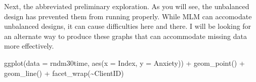 \documentclass[
  11pt,
]{book}
\newenvironment{Shaded}{\begin{snugshade}}{\end{snugshade}}
\newcommand{\AttributeTok}[1]{\textcolor[rgb]{0.77,0.63,0.00}{#1}}
\newcommand{\FunctionTok}[1]{\textcolor[rgb]{0.00,0.00,0.00}{#1}}
\newcommand{\NormalTok}[1]{#1}
\newcommand{\SpecialCharTok}[1]{\textcolor[rgb]{0.00,0.00,0.00}{#1}}
\begin{document}
Next, the abbreviated preliminary exploration. As you will see, the unbalanced design has prevented them from running properly. While MLM can accomodate unbalanced designs, it can cause difficulties here and there. I will be looking for an alternate way to produce these graphs that can accommodate missing data more effectively.

\begin{Shaded}
\begin{Highlighting}[]
\FunctionTok{ggplot}\NormalTok{(}\AttributeTok{data =}\NormalTok{ rndm30time, }\FunctionTok{aes}\NormalTok{(}\AttributeTok{x =}\NormalTok{ Index, }\AttributeTok{y =}\NormalTok{ Anxiety)) }\SpecialCharTok{+} \FunctionTok{geom\_point}\NormalTok{() }\SpecialCharTok{+} \FunctionTok{geom\_line}\NormalTok{() }\SpecialCharTok{+}
    \FunctionTok{facet\_wrap}\NormalTok{(}\SpecialCharTok{\textasciitilde{}}\NormalTok{ClientID)}
\end{Highlighting}
\end{Shaded}
\end{document}
